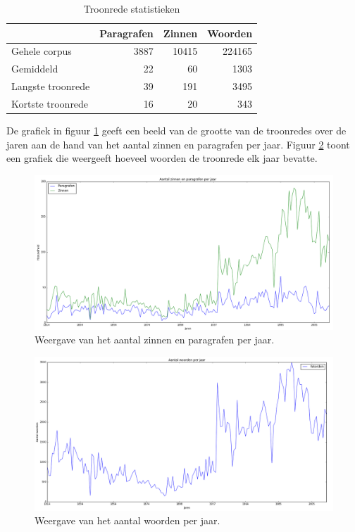 \begin{table}[H]
\centering
\begin{tabular}{lrrr}
\toprule
{} &  Paragrafen &  Zinnen &  Woorden \\
\midrule
Gehele corpus &        3887 &   10415 &   224165 \\
Gemiddeld &          22 &      60 &     1303 \\
Langste troonrede &          39 &     191 &     3495 \\
Kortste troonrede &          16 &      20 &      343 \\
\bottomrule
\end{tabular}
\caption{Troonrede statistieken}
\label{statistieken}
\end{table}

De grafiek in figuur \ref{inhoud} geeft een beeld van de grootte van de troonredes over de jaren aan de hand van het aantal zinnen en paragrafen per jaar. Figuur \ref{woorden} toont een grafiek die weergeeft hoeveel woorden de troonrede elk jaar bevatte.

\begin{figure}[H]
\begin{center}
\includegraphics[width=1.2\textwidth]{fig/Inhoudverdeling}
\caption{\label{inhoud} Weergave van het aantal zinnen en paragrafen per jaar.}
\end{center}
\end{figure}

\begin{figure}[H]
\begin{center}
\includegraphics[width=1.2\textwidth]{fig/Woordverdeling}
\caption{\label{woorden} Weergave van het aantal woorden per jaar.}
\end{center}
\end{figure}

